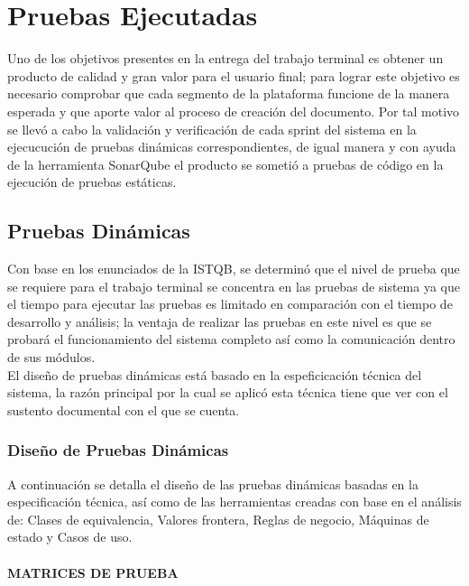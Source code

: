 \chapter{Pruebas Ejecutadas} \label{cap:ocho}
Uno de los objetivos presentes en la entrega del trabajo terminal es obtener un producto de calidad y gran valor para el usuario final; para lograr este objetivo es necesario comprobar que cada segmento de la plataforma funcione de la manera esperada y que aporte valor al proceso de creación del documento. Por tal motivo se llevó a cabo la validación y verificación de cada sprint del sistema en la ejecucución de pruebas dinámicas correspondientes, de igual manera y con ayuda de la herramienta SonarQube el producto se sometió a pruebas de código en la ejecución de pruebas estáticas.

\section{Pruebas Dinámicas}

Con base en los enunciados de la ISTQB, se determinó que el nivel de prueba que se requiere para el trabajo terminal se concentra en las pruebas de sistema ya que el tiempo para ejecutar las pruebas es limitado en comparación con el tiempo de desarrollo y análisis; la ventaja de realizar las pruebas en este nivel es que se probará el funcionamiento del sistema completo así como la comunicación dentro de sus módulos.\\

El diseño de pruebas dinámicas está basado en la espeficicación técnica del sistema, la razón principal por la cual se aplicó esta técnica tiene que ver con el sustento documental con el que se cuenta.\\

\subsection{Diseño de Pruebas Dinámicas}

A continuación se detalla el diseño de las pruebas dinámicas basadas en la especificación técnica, así como de las herramientas creadas con base en el análisis de: Clases de equivalencia, Valores frontera, Reglas de negocio, Máquinas de estado y Casos de uso.

\subsubsection{MATRICES DE PRUEBA}

